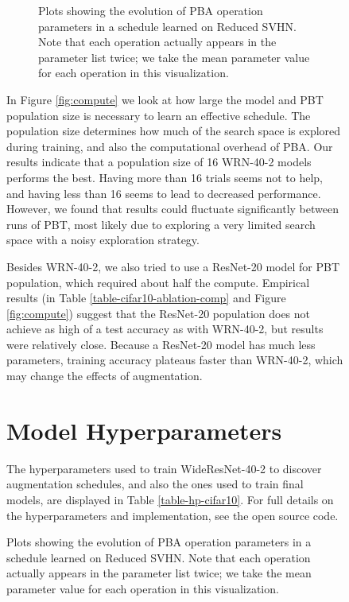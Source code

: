 \documentclass{article}
\begin{document}
\begin{figure}[t]
{\begin{table*}[t]
\begin{center}
\begin{small}
\begin{tabular}{ccccc}
\bottomrule
\end{tabular}
\end{small}
\end{center}
\vskip -0.1in
\end{table*} 
\begin{figure}[t]
  \centering
  \begin{subfigure}[Operation magnitudes.]{
  \texttt{[image: figures/svhn-mag.png]}
  }
  \end{subfigure}
  \begin{subfigure}[Normalized plot of operation probability parameters over time.]{
  \texttt{[image: figures/svhn-prob.png]}
  }
  \end{subfigure}
  \caption{Plots showing the evolution of PBA operation parameters in a schedule learned on Reduced SVHN. Note that each operation actually appears in the parameter list twice; we take the mean parameter value for each operation in this visualization.}
  \label{fig:pba-svhn-schedule}
\end{figure}

In Figure \ref{fig:compute} we look at how large the model and PBT population size is necessary to learn an effective schedule. The population size determines how much of the search space is explored during training, and also the computational overhead of PBA. Our results indicate that a population size of 16 WRN-40-2 models performs the best. Having more than 16 trials seems not to help, and having less than 16 seems to lead to decreased performance. However, we found that results could fluctuate significantly between runs of PBT, most likely due to exploring a very limited search space with a noisy exploration strategy. 

Besides WRN-40-2, we also tried to use a ResNet-20 \cite{resnet-v2} model for PBT population, which required about half the compute. Empirical results (in  Table \ref{table-cifar10-ablation-comp} and Figure \ref{fig:compute}) suggest that the ResNet-20 population does not achieve as high of a test accuracy as with WRN-40-2, but results were relatively close. Because a ResNet-20 model has much less parameters, training accuracy plateaus faster than WRN-40-2, which may change the effects of augmentation.

\section{Model Hyperparameters}
The hyperparameters used to train WideResNet-40-2 to discover augmentation schedules, and also the ones used to train final models, are displayed in Table \ref{table-hp-cifar10}. For full details on the hyperparameters and implementation, see the open source code.

}
\end{figure}
\end{document}
